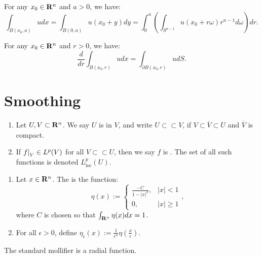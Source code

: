 \begin{corollary}
	For any $x_0 \in \mathbf{R}^n$ and $a > 0$, we have:
	\[
		\int_{B(x_0,a)}^{} u dx = \int_{B(0,a)}^{} u(x_0 + y)dy = \int_{0}^{a} \left( \int_{S^{n-1}}^{} u(x_0+r \omega)r^{n-1} d\omega \right) dr.
	\] 
\end{corollary}

\begin{corollary}
	For any  $x_0 \in \mathbf{R}^n$ and $r > 0$, we have:
	\[
	\frac{d}{dr}\int_{B(x_0,r)}^{} u dx = \int_{\partial B(x_0,r)}^{} udS.
	\] 
\end{corollary}

\section{Smoothing}

\begin{definition}
	\phantom{a}
	\begin{enumerate}[label = (\alph*),itemsep=1pt,topsep=3pt]
		\item Let $U,V \subset \mathbf{R}^n$. We say $U$ is  in $V$, and write $U \subset\subset V$, if $V \subset \overline{V} \subset U$ and $\overline{V}$ is compact. 
		\item If $\restr{f}{V} \in L^p(V)$ for all $V \subset\subset U$, then we say $f$ is . The set of all such functions is denoted $L_{\text{loc}}^p(U)$.
	\end{enumerate}
\end{definition}

\begin{definition}
	\phantom{a}
	\begin{enumerate}[label = (\alph*),itemsep=1pt,topsep=3pt]
		\item Let $x \in \mathbf{R}^n$. The  is the function:
		\[
			\eta(x) := 
				\begin{cases}
			 		\frac{-C}{1-|x|^2}, & |x| < 1 \\
					0, & |x| \geq 1
				\end{cases},
		\] 
		where $C$ is chosen so that $\int_{\mathbf{R}^n}^{} \eta(x)dx = 1$.

		\item For all $\epsilon > 0$, define $\eta_\epsilon(x) := \frac{1}{\epsilon^n}\eta\left( \frac{x}{\epsilon}\right)$.
	\end{enumerate}
\end{definition}

\begin{remark}
	The standard mollifier is a radial function.
\end{remark}

